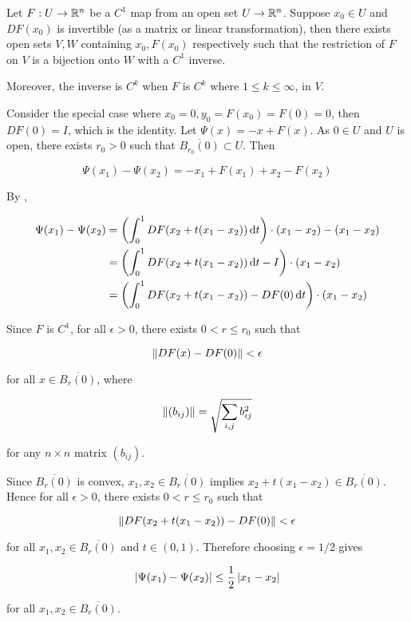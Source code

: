 \documentclass[a4paper,12pt]{article}
\begin{document}
\begin{thm}
  Let $F:U\to\mathbb{R}^{n}$ be a $C^{1}$ map from an open set $U\to\mathbb{R}^{n}$. Suppose $x_{0}\in U$ and $DF(x_{0})$ is invertible (as a matrix or linear transformation), then there exists open sets $V,W$ containing $x_{0},F(x_{0})$ respectively such that the restriction of $F$ on $V$ is a bijection onto $W$ with a $C^{1}$ inverse.\n
  
  Moreover, the inverse is $C^{k}$ when $F$ is $C^{k}$ where $1\leq k\leq\infty$, in $V$.\n

  \prf{} Consider the special case where $x_{0}=0,y_{0}=F(x_{0})=F(0)=0$, then $DF(0)=I$, which is the identity. Let $\Psi(x)=-x+F(x)$. As $0\in U$ and $U$ is open, there exists $r_{0}>0$ such that $\overline{B_{r_{0}}(0)}\subset U$. Then

  $$\Psi(x_{1})-\Psi(x_{2})=-x_{1}+F(x_{1})+x_{2}-F(x_{2})$$\s

  By \rpst[\sctd{3}],

  $$\begin{aligned}[t]
    \Psi(x_{1})-\Psi(x_{2})&=\left( \int_{0}^{1}DF(x_{2}+t(x_{1}-x_{2}))\,\mathrm{d} t\right)\cdot(x_{1}-x_{2})-(x_{1}-x_{2})\\
    &=\left( \int_{0}^{1}DF(x_{2}+t(x_{1}-x_{2}))\,\mathrm{d} t-I\right)\cdot(x_{1}-x_{2})\\
    &=\left( \int_{0}^{1}DF(x_{2}+t(x_{1}-x_{2}))-DF(0)\,\mathrm{d} t\right)\cdot(x_{1}-x_{2})
  \end{aligned}$$\s

  Since $F$ is $C^{1}$, for all $\epsilon>0$, there exists $0<r\leq r_{0}$ such that

  $$\left\| DF(x)-DF(0)\right\|<\epsilon$$\s

  for all $x\in\overline{B_{r}(0)}$, where

  $$\left\| (b_{ij})\right\|=\sqrt{\sum_{i,j}b_{ij}^{2}}$$\s

  for any $n\times n$ matrix $(b_{ij})$.\n
  
  Since $\overline{B_{r}(0)}$ is convex, $x_{1},x_{2}\in\overline{B_{r}(0)}$ implies $x_{2}+t(x_{1}-x_{2})\in\overline{B_{r}(0)}$. Hence for all $\epsilon>0$, there exists $0<r\leq r_{0}$ such that

  $$\left\| DF(x_{2}+t(x_{1}-x_{2}))-DF(0)\right\|<\epsilon$$\s

  for all $x_{1},x_{2}\in\overline{B_{r}(0)}$ and $t\in(0,1)$. Therefore choosing $\epsilon=1/2$ gives

  $$\left| \Psi(x_{1})-\Psi(x_{2})\right|\leq\frac{1}{2}\left| x_{1}-x_{2}\right|$$\s

  for all $x_{1},x_{2}\in\overline{B_{r}(0)}$.\n


\end{thm}
\end{document}
